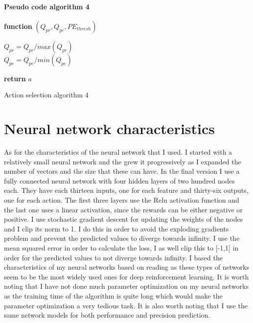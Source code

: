 \paragraph{Pseudo code algorithm 4}
\begin{center}
	\begin{algorithm}

    \textbf{function}  $(Q_{pr},Q_{pe},PE_{thresh})$\;
    
    
    \Indp{}\Indm
    \Indp{} \Indm
    \Indp
    $Q_{pr} = Q_{pr}/max(Q_{pr})$\\
    $Q_{pe} = Q_{pe}/min(Q_{pe})$\\
   
  
   \textbf{return} $a$
   
    
\caption{Action selection algorithm 4}
\end{algorithm}
\end{center}
\section{Neural network characteristics}
As for the characteristics of the neural network that I used. I started with a relatively small neural network and the grew it progressively as I expanded the number of vectors and the size that these can have. In the final version I use a fully connected neural network with four hidden layers of two hundred nodes each. They have each thirteen inputs, one for each feature and thirty-six outputs, one for each action. The first three layers use the Relu activation function and the last one uses a linear activation, since the rewards can be either negative or positive. I use stochastic gradient descent for updating the weights of the nodes and I clip its norm to 1. I do this in order to avoid the exploding gradients problem and prevent the predicted values to diverge towards infinity. I use the mean squared error in order to calculate the loss, I as well clip this to [-1,1] in order for the predicted values to not diverge towards infinity. I based the characteristics of my neural networks based on reading as these types of networks seem to be the most widely used ones for deep reinforcement learning. It is worth noting that I have not done much parameter optimization on my neural networks as the training time of the algorithm is quite long which would make the parameter optimization a very tedious task. It is also worth noting that I use the same network models for both performance and precision prediction.
